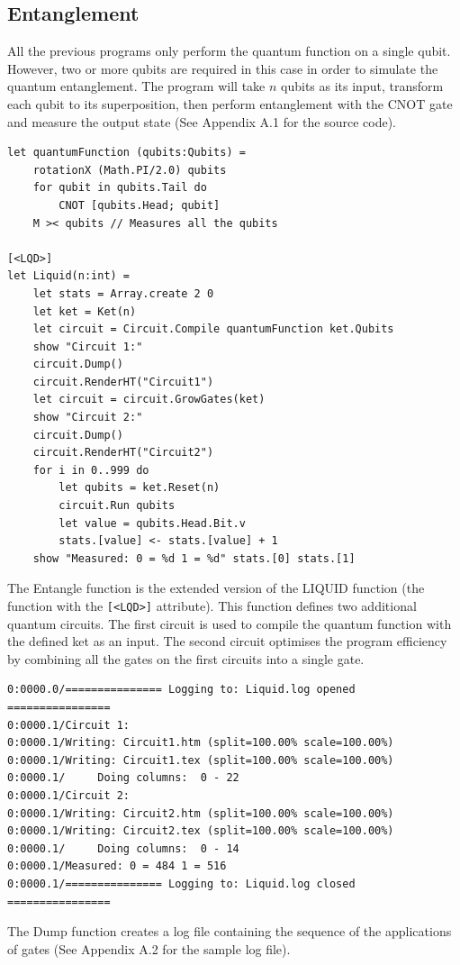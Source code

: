 \documentclass[12pt]{third-rep}
\begin{document}
\subsection{Entanglement}
All the previous programs only perform the quantum function on a single qubit. However, two or more qubits are required in this case in order to simulate the quantum entanglement. The program will take $n$ qubits as its input, transform each qubit to its superposition, then perform entanglement with the CNOT gate and measure the output state (See Appendix A.1 for the source code).
\begin{verbatim}
let quantumFunction (qubits:Qubits) =
    rotationX (Math.PI/2.0) qubits
    for qubit in qubits.Tail do 
        CNOT [qubits.Head; qubit]
    M >< qubits // Measures all the qubits

[<LQD>]
let Liquid(n:int) =
    let stats = Array.create 2 0
    let ket = Ket(n)
    let circuit = Circuit.Compile quantumFunction ket.Qubits
    show "Circuit 1:"
    circuit.Dump()
    circuit.RenderHT("Circuit1")
    let circuit = circuit.GrowGates(ket)
    show "Circuit 2:"
    circuit.Dump()
    circuit.RenderHT("Circuit2")
    for i in 0..999 do
        let qubits = ket.Reset(n) 
        circuit.Run qubits
        let value = qubits.Head.Bit.v
        stats.[value] <- stats.[value] + 1
    show "Measured: 0 = %d 1 = %d" stats.[0] stats.[1]
\end{verbatim}
The Entangle function is the extended version of the LIQUID function (the function with the \texttt{[<LQD>]} attribute). This function defines two additional quantum circuits. The first circuit is used to compile the quantum function with the defined ket as an input. The second circuit optimises the program efficiency by combining all the gates on the first circuits into a single gate.
\begin{verbatim}
0:0000.0/=============== Logging to: Liquid.log opened ================
0:0000.1/Circuit 1:
0:0000.1/Writing: Circuit1.htm (split=100.00% scale=100.00%)
0:0000.1/Writing: Circuit1.tex (split=100.00% scale=100.00%)
0:0000.1/     Doing columns:  0 - 22
0:0000.1/Circuit 2:
0:0000.1/Writing: Circuit2.htm (split=100.00% scale=100.00%)
0:0000.1/Writing: Circuit2.tex (split=100.00% scale=100.00%)
0:0000.1/     Doing columns:  0 - 14
0:0000.1/Measured: 0 = 484 1 = 516
0:0000.1/=============== Logging to: Liquid.log closed ================
\end{verbatim}
The Dump function creates a log file containing the sequence of the applications of gates (See Appendix A.2 for the sample log file). \\\\
\end{document}
